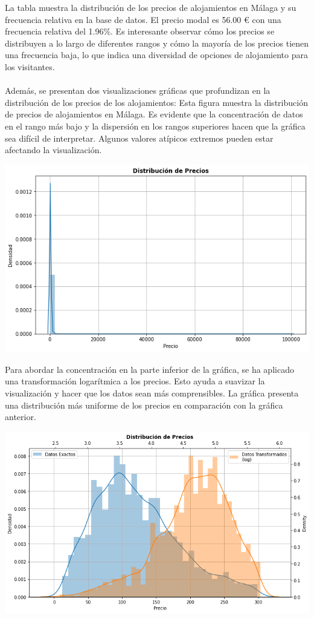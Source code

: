 La tabla muestra la distribución de los precios de alojamientos en Málaga y su frecuencia relativa en la base de datos. El precio modal es 56.00 € con una frecuencia relativa del 1.96\%. Es interesante observar cómo los precios se distribuyen a lo largo de diferentes rangos y cómo la mayoría de los precios tienen una frecuencia baja, lo que indica una diversidad de opciones de alojamiento para los visitantes.\\\\
Además, se presentan dos visualizaciones gráficas que profundizan en la distribución de los precios de los alojamientos:
\newpage
Esta figura muestra la distribución de precios de alojamientos en Málaga. Es evidente que la concentración de datos en el rango más bajo y la dispersión en los rangos superiores hacen que la gráfica sea difícil de interpretar. Algunos valores atípicos extremos pueden estar afectando la visualización.
\begin{center}
    \centering
    \includegraphics[width=1\textwidth]{capturas/15.png}
\end{center}
Para abordar la concentración en la parte inferior de la gráfica, se ha aplicado una transformación logarítmica a los precios. Esto ayuda a suavizar la visualización y hacer que los datos sean más comprensibles. La gráfica presenta una distribución más uniforme de los precios en comparación con la gráfica anterior.
\begin{center}
    \centering
    \includegraphics[width=1\textwidth]{capturas/16.png}
\end{center}

